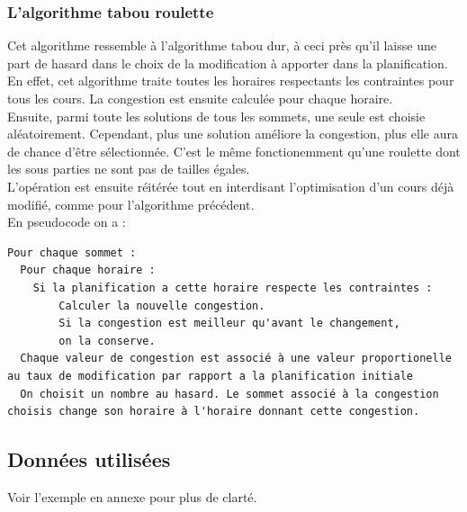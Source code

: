 \documentclass[a4paper,11pt]{article}
\begin{document}
		\subsubsection{L'algorithme tabou roulette}
			Cet algorithme ressemble à l'algorithme tabou dur, à ceci près qu'il laisse une part de hasard dans le choix de la modification à apporter dans la planification.\\
			En effet, cet algorithme traite toutes les horaires respectants les contraintes pour tous les cours. La congestion est ensuite calculée pour chaque horaire.\\
			Ensuite, parmi toute les solutions de tous les sommets, une seule est choisie aléatoirement. Cependant, plus une solution améliore la congestion, plus elle aura de chance d'être sélectionnée. C'est le même fonctionemment qu'une roulette dont les sous parties ne sont pas de tailles égales.\\
			L'opération est ensuite réitérée tout en interdisant l'optimisation d'un cours déjà modifié, comme pour l'algorithme précédent.\\
			En pseudocode on a :\\
\begin{lstlisting}
Pour chaque sommet :
  Pour chaque horaire :
  	Si la planification a cette horaire respecte les contraintes :
    	Calculer la nouvelle congestion.
    	Si la congestion est meilleur qu'avant le changement,
      	on la conserve.
  Chaque valeur de congestion est associé à une valeur proportionelle au taux de modification par rapport a la planification initiale
  On choisit un nombre au hasard. Le sommet associé à la congestion choisis change son horaire à l'horaire donnant cette congestion.
  \end{lstlisting}
	
	\subsection{Données utilisées}
		Voir l'exemple en annexe pour plus de clarté.
\end{document}
